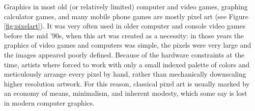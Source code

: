 \documentclass[]{usiinfbachelorproject}
\begin{document}
Graphics in most old (or relatively limited) computer and video games, graphing calculator games, and many mobile phone games are mostly pixel art (see Figure \ref{fig:pixelart}). It was very often used in older computer and console video games before the mid '90s, when this art was created as a necessity: in those years the graphics of video games and computers was simple, the pixels were very large and the images appeared poorly defined. Because of the hardware constraints at the time, artists where forced to work with only a small indexed palette of colors and meticulously arrange every pixel by hand, rather than mechanically downscaling higher resolution artwork. For this reason, classical pixel art is usually marked by an economy of means, minimalism, and inherent modesty, which some say is lost in modern computer graphics. 
\end{document}
